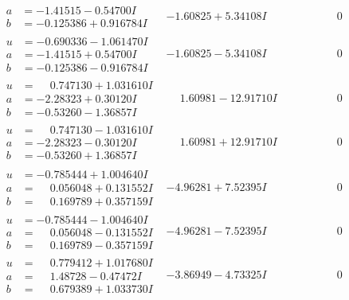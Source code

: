 \documentclass[1p]{elsarticle_modified}
\theoremstyle{definition}
\begin{document}
$$\begin{array}{c|c|c}
\begin{aligned}
a &= -1.41515 - 0.54700 I \\
b &= -0.125386 + 0.916784 I\end{aligned}
 & -1.60825 + 5.34108 I & \phantom{-0.000000 } 0 \\ \hline\begin{aligned}
u &= -0.690336 - 1.061470 I \\
a &= -1.41515 + 0.54700 I \\
b &= -0.125386 - 0.916784 I\end{aligned}
 & -1.60825 - 5.34108 I & \phantom{-0.000000 } 0 \\ \hline\begin{aligned}
u &= \phantom{-}0.747130 + 1.031610 I \\
a &= -2.28323 + 0.30120 I \\
b &= -0.53260 - 1.36857 I\end{aligned}
 & \phantom{-}1.60981 - 12.91710 I & \phantom{-0.000000 } 0 \\ \hline\begin{aligned}
u &= \phantom{-}0.747130 - 1.031610 I \\
a &= -2.28323 - 0.30120 I \\
b &= -0.53260 + 1.36857 I\end{aligned}
 & \phantom{-}1.60981 + 12.91710 I & \phantom{-0.000000 } 0 \\ \hline\begin{aligned}
u &= -0.785444 + 1.004640 I \\
a &= \phantom{-}0.056048 + 0.131552 I \\
b &= \phantom{-}0.169789 + 0.357159 I\end{aligned}
 & -4.96281 + 7.52395 I & \phantom{-0.000000 } 0 \\ \hline\begin{aligned}
u &= -0.785444 - 1.004640 I \\
a &= \phantom{-}0.056048 - 0.131552 I \\
b &= \phantom{-}0.169789 - 0.357159 I\end{aligned}
 & -4.96281 - 7.52395 I & \phantom{-0.000000 } 0 \\ \hline\begin{aligned}
u &= \phantom{-}0.779412 + 1.017680 I \\
a &= \phantom{-}1.48728 - 0.47472 I \\
b &= \phantom{-}0.679389 + 1.033730 I\end{aligned}
 & -3.86949 - 4.73325 I & \phantom{-0.000000 } 0 \\ \hline\begin{aligned}

\end{aligned}
\end{array}$$
\end{document}
